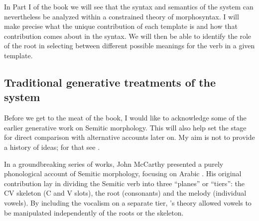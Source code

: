 In Part I of the book we will see that the syntax and semantics of the system can nevertheless be analyzed within a constrained theory of morphosyntax. I will make precise what the unique contribution of each template is and how that contribution comes about in the syntax. We will then be able to identify the role of the root in selecting between different possible meanings for the verb in a given template.


	\subsection{Traditional generative treatments of the system} \label{intro:basic:jjmcc}
Before we get to the meat of the book, I would like to acknowledge some of the earlier generative work on Semitic morphology. This will also help set the stage for direct comparison with alternative accounts later on. My aim is not to provide a history of ideas; for that see \cite{kastnertucker19cup}.

In a groundbreaking series of works, John McCarthy presented a purely phonological account of Semitic morphology, focusing on Arabic \citep{jjmcc79,jjmcc81,jjmcc89li,jjmccprince90}. His original contribution lay in dividing the Semitic verb into three ``planes'' or ``tiers'': the CV skeleton (C and V slots), the root (consonants) and the melody (individual vowels).
By including the vocalism on a separate tier, \citeauthor{jjmcc81}'s theory allowed vowels to be manipulated independently of the roots or the skeleton.

